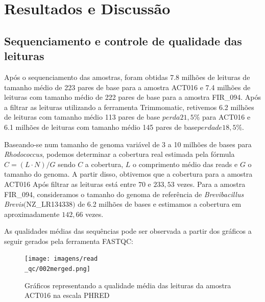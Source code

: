 \chapter{Resultados e Discussão}\label{cap:resultados}

\section{Sequenciamento e controle de qualidade das leituras}
Após o sequenciamento das amostras, foram obtidas 7.8 milhões de leituras de tamanho médio de 
223 pares de base para a amostra ACT016 e 7.4 milhões de leituras com tamanho médio de 222 pares de base
para a amostra FIR\_094. Após a filtrar as leituras utilizando a ferramenta Trimmomatic, retivemos
6.2 milhões de leituras com tamanho médio 113 pares de base \(perda 21,5\%\) para ACT016 e 6.1 milhões
de leituras com tamanho médio 145 pares de base\(perda de 18,5\%\).

Baseando-se num tamanho de genoma variável de 3 a 10 milhões de bases para \textit{Rhodococcus}, podemos
determinar a cobertura real estimada pela fórmula $C= (L\cdot N)/G $ sendo $C$ a cobertura, $L$ o comprimento
médio das reads e $G$ o tamanho do genoma. A partir disso, obtivemos que a cobertura para a amostra ACT016 Após
filtrar as leituras está entre $70$ e $233,53$ vezes. 
Para a amostra FIR\_094, consideramos o tamanho do genoma de referência de \textit{Brevibacillus Brevis}$($NZ\_LR134338$)$ 
de 6.2 milhões de bases e estimamos a cobertura em aproximadamente $142,66$ vezes.

As qualidades médias das sequências pode ser observada a partir dos gráficos a seguir gerados pela ferramenta FASTQC:

\begin{figure}[H]
	\caption{Gráficos representando a qualidade média das leituras da amostra ACT016 na escala PHRED}
	\centering
	\texttt{[image: imagens/read\\\_qc/002merged.png]} \\
	\centering
\end{figure}

\vspace{\floatsep}

